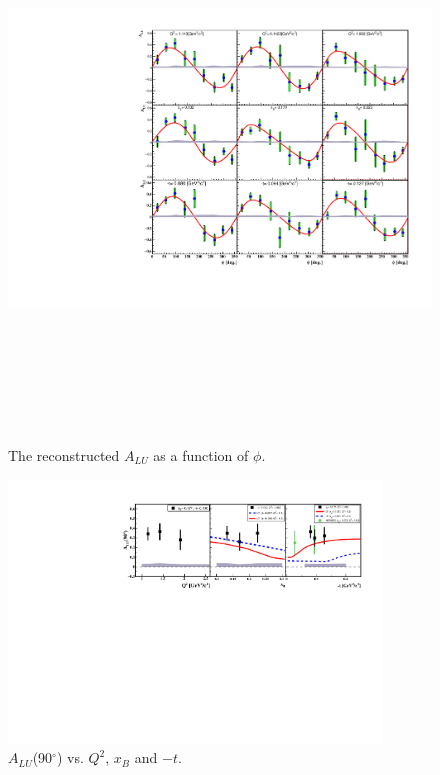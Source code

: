 \documentclass[12pt]{article}
\begin{document}
\begin{figure}[tpb]
   \centering
  \includegraphics[height=15.0cm]{coherent-ALU.pdf}
  \caption{The reconstructed $A_{LU}$ as a function of $\phi$.}
  \label{fig:}
 \end{figure}                                                                  



\begin{figure}[tpb]
   \centering
  \includegraphics[height=7.0cm]{coherent-ALU_90.pdf}
  \caption{$A_{LU}$(90$^{\circ}$) vs. $Q^{2}$, $x_B$ and $-t$.}
  \label{fig:}
 \end{figure}                                                                  
\end{document}
